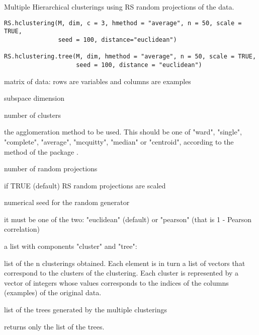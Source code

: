 \documentclass{article}
\begin{document}
\begin{Description}\relax
Multiple Hierarchical clusterings using RS random projections of the data.
\end{Description}
\begin{Usage}
\begin{verbatim}
RS.hclustering(M, dim, c = 3, hmethod = "average", n = 50, scale = TRUE, 
               seed = 100, distance="euclidean")

RS.hclustering.tree(M, dim, hmethod = "average", n = 50, scale = TRUE, 
                    seed = 100, distance = "euclidean")
\end{verbatim}
\end{Usage}
\begin{Arguments}
\begin{ldescription}
\item[\code{M}] matrix of data: rows are variables and columns are examples 
\item[\code{dim}] subspace dimension 
\item[\code{c}] number of clusters 
\item[\code{hmethod}] the agglomeration method to be used. This should be one of 
"ward", "single", "complete", "average", "mcquitty", "median" or "centroid", 
according to the 
method of the package . 
\item[\code{n}] number of  random projections 
\item[\code{scale}] if TRUE (default) RS random projections are scaled 
\item[\code{seed}] numerical seed for the random generator 
\item[\code{distance}] it must be one of the two: "euclidean" (default) or "pearson" (that is 1 - Pearson correlation) 
\end{ldescription}
\end{Arguments}
\begin{Value}
a list with components "cluster" and "tree":
\begin{ldescription}
\item[\code{cluster }] list of the n clusterings obtained. Each element is in turn a list of vectors that correspond 
to the clusters of the clustering. Each cluster is represented by a vector of integers whose values corresponds to 
the indices of the columns (examples) of the original data. 
\item[\code{tree }] list of the trees generated by the multiple clusterings
\end{ldescription}


 returns only the list of the trees.
\end{Value}
\end{document}
